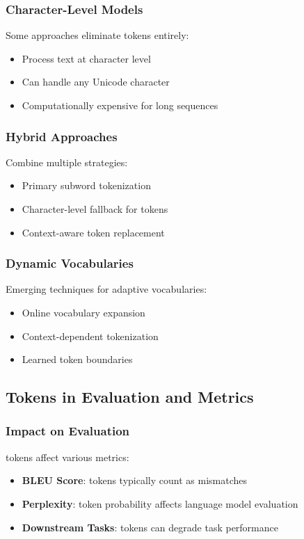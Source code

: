 \subsubsection{Character-Level Models}
Some approaches eliminate \unk{} tokens entirely:
\begin{itemize}
\item Process text at character level
\item Can handle any Unicode character
\item Computationally expensive for long sequences
\end{itemize}

\subsubsection{Hybrid Approaches}
Combine multiple strategies:
\begin{itemize}
\item Primary subword tokenization
\item Character-level fallback for \unk{} tokens
\item Context-aware token replacement
\end{itemize}

\subsubsection{Dynamic Vocabularies}
Emerging techniques for adaptive vocabularies:
\begin{itemize}
\item Online vocabulary expansion
\item Context-dependent tokenization
\item Learned token boundaries
\end{itemize}

\subsection{\unk{} Tokens in Evaluation and Metrics}

\subsubsection{Impact on Evaluation}
\unk{} tokens affect various metrics:
\begin{itemize}
\item \textbf{BLEU Score}: \unk{} tokens typically count as mismatches
\item \textbf{Perplexity}: \unk{} token probability affects language model evaluation
\item \textbf{Downstream Tasks}: \unk{} tokens can degrade task performance
\end{itemize}

